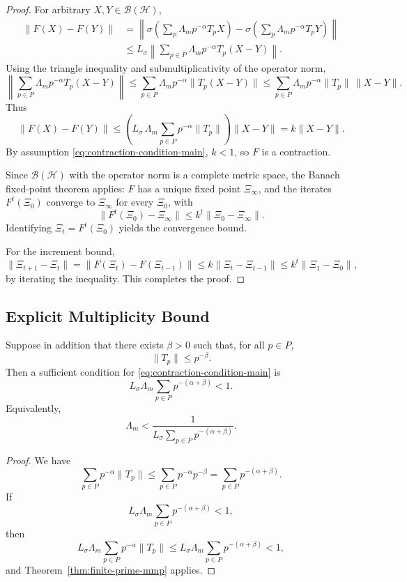\documentclass[12pt]{article}
\begin{document}
\begin{proof}
For arbitrary \(X,Y\in \mathcal{B}(\mathcal{H})\),
\[
  \begin{aligned}
    \|F(X)-F(Y)\|
    &=
    \left\|\sigma\!\left(\sum_{p} \Lambda_m p^{-\alpha} T_p X\right)
    -
    \sigma\!\left(\sum_{p} \Lambda_m p^{-\alpha} T_p Y\right)
    \right\| \\
    &\le
    L_\sigma \left\|\sum_{p\in P} \Lambda_m p^{-\alpha} T_p (X-Y)\right\|.
  \end{aligned}
\]
Using the triangle inequality and submultiplicativity of the operator norm,
\[
  \left\|\sum_{p\in P} \Lambda_m p^{-\alpha} T_p (X-Y)\right\|
  \le
  \sum_{p\in P} \Lambda_m p^{-\alpha} \|T_p(X-Y)\|
  \le
  \sum_{p\in P} \Lambda_m p^{-\alpha} \|T_p\| \,\|X-Y\|.
\]
Thus
\[
  \|F(X)-F(Y)\|
  \le
  \left(L_\sigma\,\Lambda_m \sum_{p\in P} p^{-\alpha}\|T_p\|\right) \|X-Y\|
  = k \|X-Y\|.
\]
By assumption \eqref{eq:contraction-condition-main}, \(k<1\), so \(F\) is a contraction.

Since \(\mathcal{B}(\mathcal{H})\) with the operator norm is a complete metric space, the Banach fixed-point theorem applies: \(F\) has a unique fixed point \(\Xi_\infty\), and the iterates \(F^t(\Xi_0)\) converge to \(\Xi_\infty\) for every \(\Xi_0\), with
\[
  \|F^t(\Xi_0) - \Xi_\infty\|
  \le
  k^t \|\Xi_0 - \Xi_\infty\|.
\]
Identifying \(\Xi_t = F^t(\Xi_0)\) yields the convergence bound.

For the increment bound,
\[
  \|\Xi_{t+1}-\Xi_t\|
  = \|F(\Xi_t)-F(\Xi_{t-1})\|
  \le k \|\Xi_t - \Xi_{t-1}\|
  \le k^t \|\Xi_1 - \Xi_0\|,
\]
by iterating the inequality. This completes the proof.
\end{proof}

\subsection{Explicit Multiplicity Bound}

\begin{corollary}
Suppose in addition that there exists \(\beta>0\) such that, for all \(p\in P\),
\[
  \|T_p\| \le p^{-\beta}.
\]
Then a sufficient condition for \eqref{eq:contraction-condition-main} is
\[
  L_\sigma \Lambda_m \sum_{p\in P} p^{-(\alpha+\beta)} < 1.
\]
Equivalently,
\[
  \Lambda_m < \frac{1}{L_\sigma \sum_{p\in P} p^{-(\alpha+\beta)}}.
\]
\end{corollary}

\begin{proof}
We have
\[
  \sum_{p\in P} p^{-\alpha}\|T_p\|
  \le \sum_{p\in P} p^{-\alpha} p^{-\beta}
  = \sum_{p\in P} p^{-(\alpha+\beta)}.
\]
If
\[
  L_\sigma\Lambda_m \sum_{p\in P} p^{-(\alpha+\beta)} < 1,
\]
then
\[
  L_\sigma\Lambda_m \sum_{p\in P} p^{-\alpha}\|T_p\|
  \le
  L_\sigma\Lambda_m \sum_{p\in P} p^{-(\alpha+\beta)} < 1,
\]
and Theorem~\ref{thm:finite-prime-mmp} applies.
\end{proof}
\end{document}
